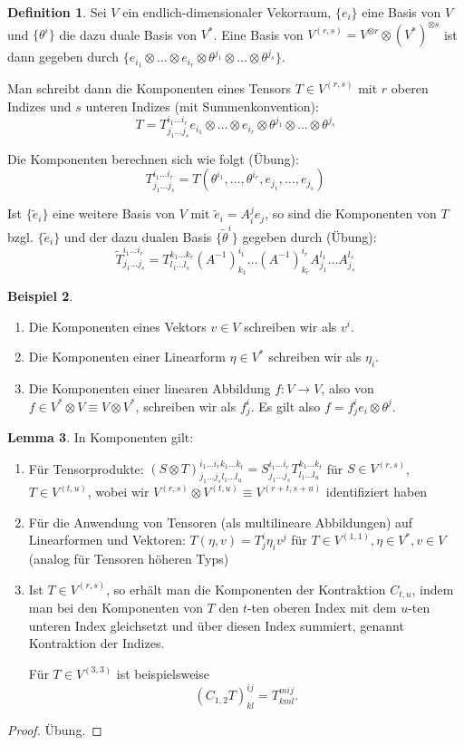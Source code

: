 \documentclass[a4paper]{scrbook}
\numberwithin{equation}{chapter}
\theoremstyle{definition}
\newtheorem{defn}{Definition}[section]
\newtheorem{lemma}[defn]{Lemma}
\newtheorem{bsp}[defn]{Beispiel}
\newcommand{\bewUeb}{\begin{proof}Übung.\end{proof}}
\begin{document}
\begin{defn}
	Sei $V$ ein endlich-dimensionaler Vekorraum, $\{e_i\}$ eine Basis von $V$ und $\{\theta^i\}$ die dazu duale Basis von $V^*$. Eine Basis von $V^{(r,s)} = V^{\otimes r} \otimes (V^*)^{\otimes s}$ ist dann gegeben durch $\{e_{i_1} \otimes \dots \otimes e_{i_r} \otimes \theta^{j_1} \otimes \dots \otimes \theta^{j_s}\}$.

	Man schreibt dann die Komponenten eines Tensors $T \in V^{(r,s)}$ mit $r$ oberen Indizes und $s$ unteren Indizes (mit Summenkonvention):
	\[T = T^{i_1 \dots i_r}_{j_1 \dots j_s} e_{i_1} \otimes \dots \otimes e_{i_r} \otimes \theta^{j_1} \otimes \dots \otimes \theta^{j_s}\]

	Die Komponenten berechnen sich wie folgt (Übung):
	\[T^{i_1 \dots i_r}_{j_1 \dots j_s} = T(\theta^{i_1}, \dots, \theta^{i_r}, e_{j_1}, \dots, e_{j_s})\]

	Ist $\{\tilde e_i\}$ eine weitere Basis von $V$ mit $\tilde e_i = A^j_i e_j$, so sind die Komponenten von $T$ bzgl. $\{\tilde e_i\}$ und der dazu dualen Basis $\{\tilde \theta^i\}$ gegeben durch (Übung):
	\[\tilde T^{i_1 \dots i_r}_{j_1 \dots j_s} = T^{k_1 \dots k_r}_{l_1 \dots l_s} (A^{-1})^{i_1}_{k_1} \dots (A^{-1})^{i_r}_{k_r} A^{l_1}_{j_1} \dots A^{l_s}_{j_s}\]
\end{defn}
\begin{bsp}
	\begin{enumerate}[label=(\alph*)]
		\item Die Komponenten eines Vektors $v\in V$ schreiben wir als $v^i$.
		\item Die Komponenten einer Linearform $\eta \in V^*$ schreiben wir als $\eta_i$.
		\item Die Komponenten einer linearen Abbildung $f\colon V \to V$, also von $f \in V^*\otimes V \equiv V \otimes V^*$, schreiben wir als $f^i_j$. Es gilt also $f = f^i_j e_i\otimes\theta^j$.
	\end{enumerate}
\end{bsp}
\begin{lemma}
	In Komponenten gilt:
	\begin{enumerate}[label=(\alph*)]
		\item Für Tensorprodukte: $(S\otimes T)^{i_1 \dots i_r k_1 \dots k_t}_{j_1 \dots j_s l_1 \dots l_u} = S^{i_1 \dots i_r}_{j_1 \dots j_s} T^{k_1 \dots k_t}_{l_1 \dots l_u}$ für $S \in V^{(r,s)}$, $T \in V^{(t,u)}$, wobei wir $V^{(r,s)} \otimes V^{(t,u)} \equiv V^{(r+t, s+u)}$ identifiziert haben
		\item Für die Anwendung von Tensoren (als multilineare Abbildungen) auf Linearformen und Vektoren: $T(\eta,v) = T^i_j \eta_i v^j$ für $T \in V^{(1,1)}, \eta \in V^*, v \in V$ (analog für Tensoren höheren Typs)
		\item Ist $T \in V^{(r,s)}$, so erhält man die Komponenten der Kontraktion $C_{t,u}$, indem man bei den Komponenten von $T$ den $t$-ten oberen Index mit dem $u$-ten unteren Index gleichsetzt und über diesen Index summiert, genannt \glqq Kontraktion der Indizes\grqq.

			Für $T \in V^{(3,3)}$ ist beispielsweise
			\[(C_{1,2}T)^{ij}_{kl} = T^{mij}_{kml}.\]
	\end{enumerate}
	\bewUeb
\end{lemma}
\end{document}
